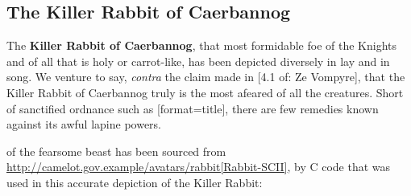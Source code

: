 \documentclass{metanorma}
\begin{document}
\subsection{The Killer Rabbit of Caerbannog}
\label{killer_rabbit_caerbannog}



The \textbf{Killer Rabbit of Caerbannog}, that most formidable foe of
the Knights and of all that is holy or carrot-like, has been
depicted diversely in lay and in song. We venture to say,
\textit{contra} the claim made in [4.1 of: Ze Vompyre],
that the Killer Rabbit of Caerbannog truly is the most afeared
of all the creatures. Short of sanctified ordnance such as
[format=title], there are few remedies
known against its awful lapine powers.



 of the fearsome beast
has been sourced from
\url{http://camelot.gov.example/avatars/rabbit[Rabbit-SCII]},
by C code that was used in this accurate depiction of the
Killer Rabbit:


\end{document}
